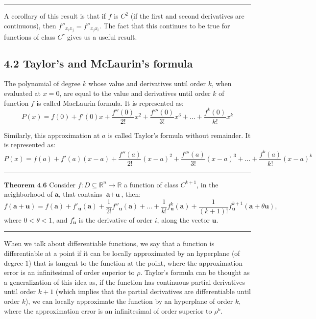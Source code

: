 \documentclass[0pt, a4paper]{article}
\begin{document}
\noindent\rule{\textwidth}{1pt}

A corollary of this result is that if $f$ is $C^2$ (if the first and second derivatives are continuous), then $f''_{x_ix_j}=f''_{x_jx_i}$. The fact that this continues to be true for functions of class $C^r$ gives us a useful result.

\subsection*{4.2 Taylor's and McLaurin's formula}

The polynomial of degree $k$ whose value and derivatives until order $k$, when evaluated at $x=0$, are equal to the value and derivatives until order $k$ of function $f$ is called MacLaurin formula. It is represented as:
$$P(x)=f(0)+f'(0)x+\frac{f''(0)}{2!}x^2+\frac{f'''(0)}{3!}x^3+\dots+\frac{f^k(0)}{k!}x^k$$


Similarly, this approximation at $a$ is called Taylor's formula without remainder. It is represented as:
$$P(x)=f(a)+f'(a)(x-a)+\frac{f''(a)}{2!}(x-a)^2+\frac{f'''(a)}{3!}(x-a)^3+\dots+\frac{f^k(a)}{k!}(x-a)^k$$


\noindent\rule{\textwidth}{1pt}

$\textbf{Theorem 4.6}$ Consider $f:D\subseteq\mathbb{R}^n\to\mathbb{R}$ a function of class $C^{k+1}$, in the neighborhood of $\textbf{a}$, that contains $\textbf{a}+\textbf{u}$, then:
$$f(\textbf{a}+\textbf{u})=f(\textbf{a})+f'_\textbf{u}(\textbf{a})+\frac{1}{2!}f''_\textbf{u}(\textbf{a})+\dots+\frac{1}{k!}f^k_\textbf{u}(\textbf{a})+\frac{1}{(k+1)!}f^{k+1}_\textbf{u}(\textbf{a}+\theta\textbf{u}),$$
where $0<\theta<1$, and $f^i_\textbf{u}$ is the derivative of order $i$, along the vector $\textbf{u}$.

\noindent\rule{\textwidth}{1pt}

When we talk about differentiable functions, we say that a function is differentiable at a point if it can be locally approximated by an hyperplane (of degree $1$) that is tangent to the function at the point, where the approximation error is an infinitesimal of order superior to $\rho$. Taylor's formula can be thought as a generalization of this idea as, if the function has continuous partial derivatives until order $k+1$ (which implies that the partial derivatives are differentiable until order $k$), we can locally approximate  the function by an hyperplane of order $k$, where the approximation error is an infinitesimal of order superior to $\rho^k$.
\end{document}
